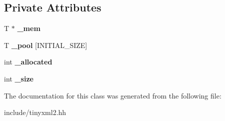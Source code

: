 \subsection*{Private Attributes}
\begin{DoxyCompactItemize}
\item 
T $\ast$ {\bfseries \+\_\+mem}\hypertarget{classtinyxml2_1_1DynArray_ac8511e876d55f3ec64277516273434fd}{}\label{classtinyxml2_1_1DynArray_ac8511e876d55f3ec64277516273434fd}

\item 
T {\bfseries \+\_\+pool} \mbox{[}I\+N\+I\+T\+I\+A\+L\+\_\+\+S\+I\+ZE\mbox{]}\hypertarget{classtinyxml2_1_1DynArray_a26ed1f7dab98229d2ed867a07ee427df}{}\label{classtinyxml2_1_1DynArray_a26ed1f7dab98229d2ed867a07ee427df}

\item 
int {\bfseries \+\_\+allocated}\hypertarget{classtinyxml2_1_1DynArray_aee2522b771ca30bc09bff4d5b3176bfc}{}\label{classtinyxml2_1_1DynArray_aee2522b771ca30bc09bff4d5b3176bfc}

\item 
int {\bfseries \+\_\+size}\hypertarget{classtinyxml2_1_1DynArray_a40f0578cc1912eed17fb29f64daf6ae9}{}\label{classtinyxml2_1_1DynArray_a40f0578cc1912eed17fb29f64daf6ae9}

\end{DoxyCompactItemize}


The documentation for this class was generated from the following file\+:\begin{DoxyCompactItemize}
\item 
include/tinyxml2.\+hh\end{DoxyCompactItemize}
